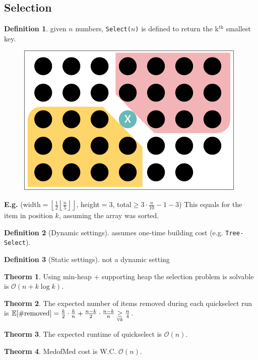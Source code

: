 \documentclass[]{article}
\newcommand\compactsection   [1]        {\vspace{-10pt}\section{#1}\vspace{-5pt}}
\theoremstyle{definition}
\newtheorem{Theorem}{\color{theoColor}Theorm}
\newtheorem{Definition}{\color{defiColor}Definition}
\newcommand\theo  [1] {\begin{Theorem}#1\end{Theorem}}
\newcommand\defi  [1] {\begin{Definition}#1\end{Definition}}
\newcommand\E     {\mathbb{E}}
\newcommand\oc    {\mathcal{O}}
\newcommand\rf    {\right\rfloor}
\newcommand\lf    {\left\lfloor}
\newcommand\floor [1] {\lf #1 \rf}
\begin{document}
\begin{multicols}{4}
		\compactsection{Selection}
			\defi{given $n$ numbers, \texttt{Select($n$)} is defined to return the k$^{\text{th}}$ smallest key. }
			\begin{figure}
				\includegraphics[width=\linewidth]{images/MedofMed}
				\vspace{-10pt}
			\end{figure}
			\textbf{E.g.} (width$=\floor{\frac{1}{2}\floor{\frac{n}{5}}}$, height$=3$, total$\ge3 \cdot \frac{n}{10} - 1 - 3$)
			This equals for the item in position $k$, assuming the array was sorted. 
			\begin{Definition}[Dynamic settings]
					assumes one-time building cost (e.g. \texttt{Tree-Select}). 
			\end{Definition}
			\begin{Definition}[Static settings]
				not a dynamic setting
			\end{Definition}
			\theo{Using min-heap + supporting heap the selection problem is solvable is $\oc(n + k \log k)$. }
			\theo{The expected number of items removed during each quickselect run is $\E[\#\text{\rm removed}] = \frac{k}{2}\cdot\frac{k}{n} + \frac{n - k}{2}\cdot\frac{n - k}{n} \underset{\forall k}{\ge} \frac{n}{4}$. }
			\theo{The expected runtime of quickselect is $\oc(n)$. }
			\theo{MedofMed cost is W.C. $\oc(n)$. }
			

\end{multicols}
\end{document}
